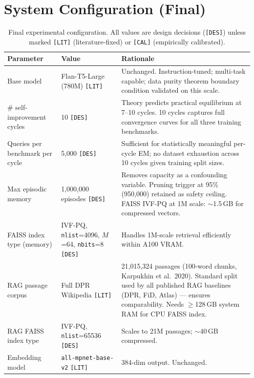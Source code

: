 \documentclass[12pt,a4paper]{article}
\begin{document}
\section{System Configuration (Final)}
\label{sec:config}

\begin{table}[htbp]
\centering
\caption{Final experimental configuration. All values are design decisions
(\texttt{[DES]}) unless marked \texttt{[LIT]} (literature-fixed) or
\texttt{[CAL]} (empirically calibrated).}
\label{tab:config}
\renewcommand{\arraystretch}{1.35}
\begin{tabular}{@{}p{5.0cm}p{3.5cm}p{5.0cm}@{}}
\toprule
\textbf{Parameter} & \textbf{Value} & \textbf{Rationale} \\
\midrule
Base model & Flan-T5-Large (780M) \texttt{[LIT]} &
  Unchanged. Instruction-tuned; multi-task capable; data purity theorem
  boundary condition validated on this scale. \\
\# self-improvement cycles & 10 \texttt{[DES]} &
  Theory predicts practical equilibrium at 7--10 cycles.
  10 cycles captures full convergence curves for all three training benchmarks. \\
Queries per benchmark per cycle & 5,000 \texttt{[DES]} &
  Sufficient for statistically meaningful per-cycle EM; no dataset
  exhaustion across 10 cycles given training split sizes. \\
Max episodic memory & 1,000,000 episodes \texttt{[DES]} &
  Removes capacity as a confounding variable. Pruning trigger at 95\%
  (950,000) retained as safety ceiling. FAISS IVF-PQ at 1M scale:
  $\sim$1.5\,GB for compressed vectors. \\
FAISS index type (memory) & IVF-PQ, \texttt{nlist}=4096,
  $M$=64, \texttt{nbits}=8 \texttt{[DES]} &
  Handles 1M-scale retrieval efficiently within A100 VRAM. \\
RAG passage corpus & Full DPR Wikipedia \texttt{[LIT]} &
  21,015,324 passages (100-word chunks, Karpukhin et al.\ 2020).
  Standard split used by all published RAG baselines (DPR, FiD, Atlas) ---
  ensures comparability. Needs $\geq$128\,GB system RAM for CPU FAISS index. \\
RAG FAISS index type & IVF-PQ, \texttt{nlist}=65536 \texttt{[DES]} &
  Scales to 21M passages; $\sim$40\,GB compressed. \\
Embedding model & \texttt{all-mpnet-base-v2} \texttt{[LIT]} &
  384-dim output. Unchanged. \\

\end{tabular}
\end{table}
\end{document}
